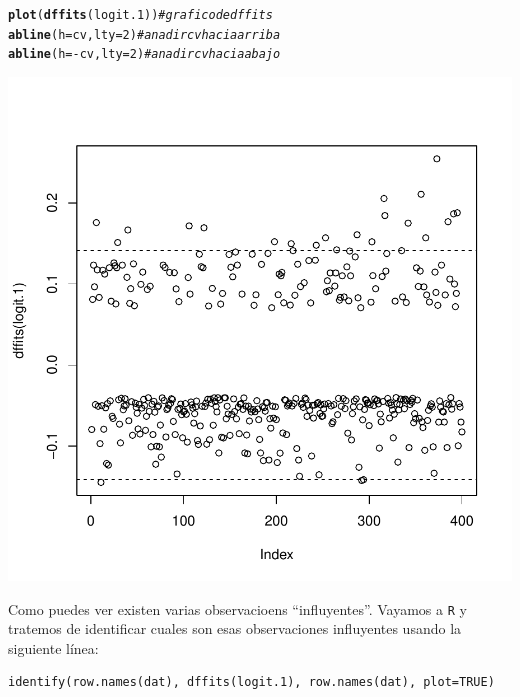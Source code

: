 \documentclass[onesided]{article}\usepackage[]{graphicx}\usepackage[]{color}
\makeatletter
\def\maxwidth{ %
  \ifdim\Gin@nat@width>\linewidth
    \linewidth
  \else
    \Gin@nat@width
  \fi
}
\newcommand{\hlnum}[1]{\textcolor[rgb]{0.686,0.059,0.569}{#1}}%
\newcommand{\hlcom}[1]{\textcolor[rgb]{0.678,0.584,0.686}{\textit{#1}}}%
\newcommand{\hlopt}[1]{\textcolor[rgb]{0,0,0}{#1}}%
\newcommand{\hlstd}[1]{\textcolor[rgb]{0.345,0.345,0.345}{#1}}%
\newcommand{\hlkwc}[1]{\textcolor[rgb]{0.333,0.667,0.333}{#1}}%
\newcommand{\hlkwd}[1]{\textcolor[rgb]{0.737,0.353,0.396}{\textbf{#1}}}%
\newenvironment{kframe}{%
 \def\at@end@of@kframe{}%
 \ifinner\ifhmode%
  \def\at@end@of@kframe{\end{minipage}}%
  \begin{minipage}{\columnwidth}%
 \fi\fi%
 \def\FrameCommand##1{\hskip\@totalleftmargin \hskip-\fboxsep
 \colorbox{shadecolor}{##1}\hskip-\fboxsep
     \hskip-\linewidth \hskip-\@totalleftmargin \hskip\columnwidth}%
 \MakeFramed {\advance\hsize-\width
   \@totalleftmargin\z@ \linewidth\hsize
   \@setminipage}}%
 {\par\unskip\endMakeFramed%
 \at@end@of@kframe}
\newenvironment{knitrout}{}{} %
\makeatother
\begin{document}
\begin{knitrout}
\color{fgcolor}\begin{kframe}
\begin{alltt}
\hlkwd{plot}\hlstd{(}\hlkwd{dffits}\hlstd{(logit.1))} \hlcom{# grafico de dffits}
\hlkwd{abline}\hlstd{(}\hlkwc{h} \hlstd{= cv,} \hlkwc{lty} \hlstd{=} \hlnum{2}\hlstd{)} \hlcom{# anadir cv hacia arriba}
\hlkwd{abline}\hlstd{(}\hlkwc{h} \hlstd{=} \hlopt{-}\hlstd{cv,} \hlkwc{lty} \hlstd{=} \hlnum{2}\hlstd{)} \hlcom{# anadir cv hacia abajo}
\end{alltt}
\end{kframe}

{\centering \includegraphics[width=\maxwidth]{figure/DFFITS:p-1} 

}



\end{knitrout}

Como puedes ver existen varias observacioens ``influyentes''. Vayamos a \texttt{R} y tratemos de identificar cuales son esas observaciones influyentes usando la siguiente l\'inea:

\begin{verbatim}
identify(row.names(dat), dffits(logit.1), row.names(dat), plot=TRUE)
\end{verbatim}
\end{document}
